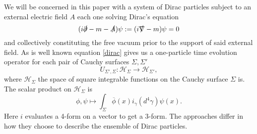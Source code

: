 \documentclass[a4paper,11pt]{article}
\begin{document}
We will be concerned in this paper with a system of Dirac particles subject to an external electric field \(A\) each one solving 
Dirac's equation
\begin{equation}\label{dirac}
(i\slashed{\partial} - m - \slashed{A})\psi:=(i\slashed{\nabla}-m)\psi = 0
\end{equation}
and collectively constituting the free vacuum prior to the support of said external field. As is well known equation \eqref{dirac} gives us a 
one-particle time evolution operator for each pair of Cauchy surfaces \(\Sigma, \Sigma'\)
\begin{equation}
U_{\Sigma',\Sigma}:\mathcal{H}_\Sigma \rightarrow \mathcal{H}_{\Sigma'},
\end{equation}
where \(\mathcal{H}_\Sigma\) the space of square integrable functions on the Cauchy surface \(\Sigma\) is. The scalar product on \(\mathcal{H}_\Sigma\)
is
\begin{equation}
\phi,\psi \mapsto \int_{\Sigma} \overline{\phi}(x) i_{\gamma}(d^4\gamma) \psi(x).
\end{equation}
Here \(i\) evaluates a 4-form on a vector to get a 3-form.
The approaches differ in how they choose to describe the ensemble of Dirac particles. 
\end{document}
